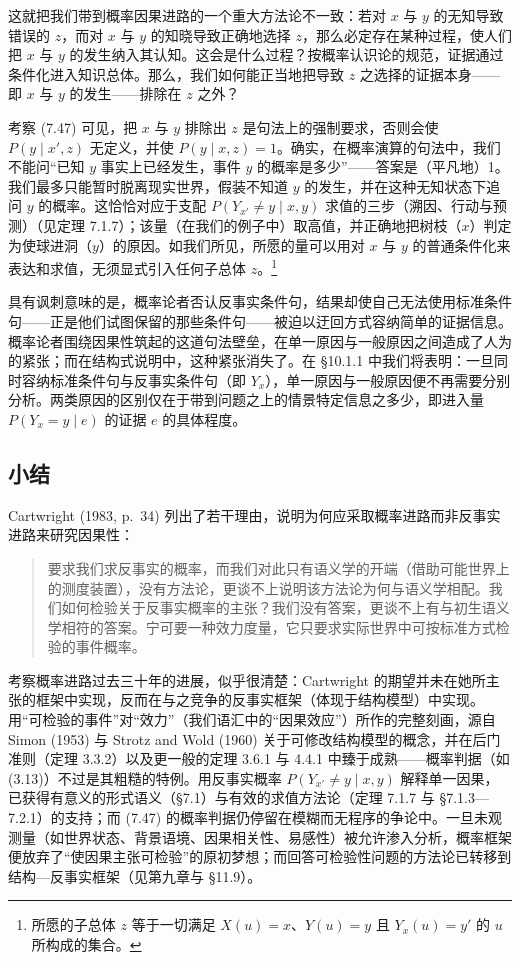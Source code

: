这就把我们带到概率因果进路的一个重大方法论不一致：若对 $x$ 与 $y$ 的无知导致错误的 $z$，而对 $x$ 与 $y$ 的知晓导致正确地选择 $z$，那么必定存在某种过程，使人们把 $x$ 与 $y$ 的发生纳入其认知。这会是什么过程？按概率认识论的规范，证据通过条件化进入知识总体。那么，我们如何能正当地把导致 $z$ 之选择的证据本身——即 $x$ 与 $y$ 的发生——排除在 $z$ 之外？

考察 \textup{(7.47)} 可见，把 $x$ 与 $y$ 排除出 $z$ 是句法上的强制要求，否则会使 $P(y\mid x',z)$ 无定义，并使 $P(y\mid x,z)=1$。确实，在概率演算的句法中，我们不能问“已知 $y$ 事实上已经发生，事件 $y$ 的概率是多少”——答案是（平凡地）1。我们最多只能暂时脱离现实世界，假装不知道 $y$ 的发生，并在这种无知状态下追问 $y$ 的概率。这恰恰对应于支配 $P(Y_{x'}\ne y\mid x,y)$ 求值的三步（溯因、行动与预测）（见定理 7.1.7）；该量（在我们的例子中）取高值，并正确地把树枝（$x$）判定为使球进洞（$y$）的原因。如我们所见，所愿的量可以用对 $x$ 与 $y$ 的普通条件化来表达和求值，无须显式引入任何子总体 $z$。\footnote{所愿的子总体 $z$ 等于一切满足 $X(u)=x$、$Y(u)=y$ 且 $Y_x(u)=y'$ 的 $u$ 所构成的集合。}

具有讽刺意味的是，概率论者否认反事实条件句，结果却使自己无法使用标准条件句——正是他们试图保留的那些条件句——被迫以迂回方式容纳简单的证据信息。概率论者围绕因果性筑起的这道句法壁垒，在单一原因与一般原因之间造成了人为的紧张；而在结构式说明中，这种紧张消失了。在 \S 10.1.1 中我们将表明：一旦同时容纳标准条件句与反事实条件句（即 $Y_x$），单一原因与一般原因便不再需要分别分析。两类原因的区别仅在于带到问题之上的情景特定信息之多少，即进入量 $P(Y_x=y\mid e)$ 的证据 $e$ 的具体程度。

\subsection{小结}

Cartwright (1983, p.~34) 列出了若干理由，说明为何应采取概率进路而非反事实进路来研究因果性：

\begin{quote}
\kaishu
[反事实进路]要求我们求反事实的概率，而我们对此只有语义学的开端（借助可能世界上的测度装置），没有方法论，更谈不上说明该方法论为何与语义学相配。我们如何检验关于反事实概率的主张？我们没有答案，更谈不上有与初生语义学相符的答案。宁可要一种效力度量，它只要求实际世界中可按标准方式检验的事件概率。
\end{quote}

考察概率进路过去三十年的进展，似乎很清楚：Cartwright 的期望并未在她所主张的框架中实现，反而在与之竞争的反事实框架（体现于结构模型）中实现。用“可检验的事件”对“效力”（我们语汇中的“因果效应”）所作的完整刻画，源自 Simon (1953) 与 Strotz and Wold (1960) 关于可修改结构模型的概念，并在后门准则（定理 3.3.2）以及更一般的定理 3.6.1 与 4.4.1 中臻于成熟——概率判据（如 \textup{(3.13)}）不过是其粗糙的特例。用反事实概率 $P(Y_{x'}\ne y\mid x,y)$ 解释单一因果，已获得有意义的形式语义（\S 7.1）与有效的求值方法论（定理 7.1.7 与 \S 7.1.3—7.2.1）的支持；而 \textup{(7.47)} 的概率判据仍停留在模糊而无程序的争论中。一旦未观测量（如世界状态、背景语境、因果相关性、易感性）被允许渗入分析，概率框架便放弃了“使因果主张可检验”的原初梦想；而回答可检验性问题的方法论已转移到结构—反事实框架（见第九章与 \S 11.9）。


